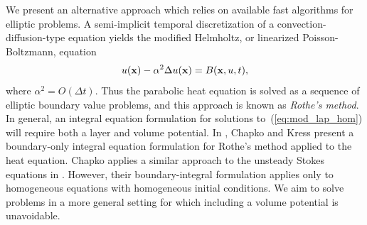 \documentclass[preprint,12pt]{elsarticle}
\newcommand{\x}{{\bf x}}
\newcommand{\eqr}[1]{~(\ref{#1})}
\begin{document}
We present an alternative approach which relies on available fast algorithms for elliptic problems. 
A semi-implicit temporal discretization of a convection-diffusion-type equation yields the modified Helmholtz, or linearized Poisson-Boltzmann, equation
\begin{equation}
  u(\x) - \alpha^2 \Delta u(\x) = B(\x,u,t),
  \label{eq:mod_lap_hom}
\end{equation}
where $\alpha^2 = O(\Delta t)$. 
Thus the parabolic heat equation is solved as a sequence of elliptic boundary value problems, and this approach is known as {\it Rothe's method}.
In general, an integral equation formulation for solutions to\eqr{eq:mod_lap_hom} will require both a layer and volume potential. 
In \cite{chapko_kress}, Chapko and Kress present a boundary-only integral equation formulation for Rothe's method applied to the heat equation. Chapko applies a similar approach to the unsteady Stokes equations in \cite{chapko}.
However, their boundary-integral formulation applies only to homogeneous equations with homogeneous initial conditions. We aim to solve problems in a more general setting for which including a volume potential is unavoidable. 
\end{document}
